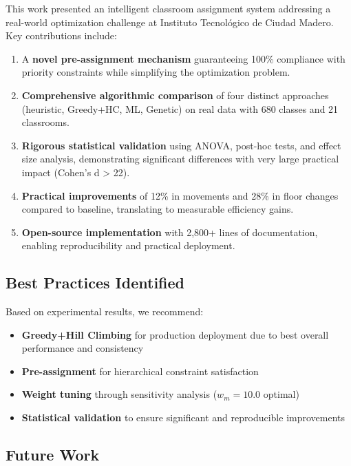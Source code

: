 \documentclass[algorithms,article,submit,pdftex,moreauthors]{Definitions/mdpi}
\begin{document}
This work presented an intelligent classroom assignment system addressing a real-world optimization challenge at Instituto Tecnológico de Ciudad Madero. Key contributions include:

\begin{enumerate}
\item A \textbf{novel pre-assignment mechanism} guaranteeing 100\% compliance with priority constraints while simplifying the optimization problem.

\item \textbf{Comprehensive algorithmic comparison} of four distinct approaches (heuristic, Greedy+HC, ML, Genetic) on real data with 680 classes and 21 classrooms.

\item \textbf{Rigorous statistical validation} using ANOVA, post-hoc tests, and effect size analysis, demonstrating significant differences with very large practical impact (Cohen's d > 22).

\item \textbf{Practical improvements} of 12\% in movements and 28\% in floor changes compared to baseline, translating to measurable efficiency gains.

\item \textbf{Open-source implementation} with 2,800+ lines of documentation, enabling reproducibility and practical deployment.
\end{enumerate}

\subsection{Best Practices Identified}

Based on experimental results, we recommend:

\begin{itemize}
\item \textbf{Greedy+Hill Climbing} for production deployment due to best overall performance and consistency
\item \textbf{Pre-assignment} for hierarchical constraint satisfaction
\item \textbf{Weight tuning} through sensitivity analysis ($w_m=10.0$ optimal)
\item \textbf{Statistical validation} to ensure significant and reproducible improvements
\end{itemize}

\subsection{Future Work}
\end{document}
